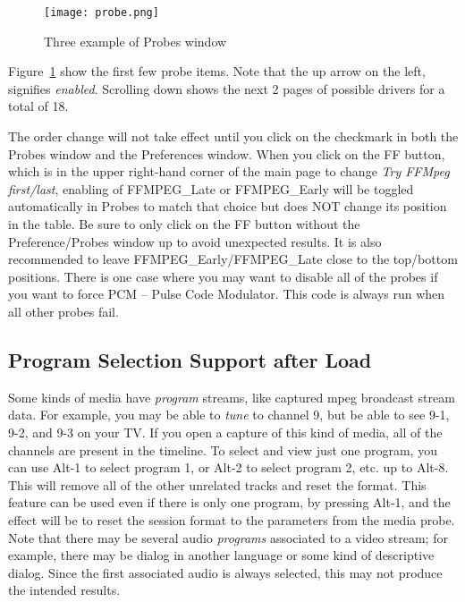 \begin{figure}[htpb]
    \centering
    \texttt{[image: probe.png]}
    \caption{Three example of Probes window}
    \label{fig:probe}
\end{figure}

Figure~\ref{fig:probe} show the first few probe items.  Note that the up arrow on the left, signifies \textit{enabled}.
Scrolling down shows the next 2 pages of possible drivers for a total of 18.

The order change will not take effect until you click on the checkmark in both the Probes window and the Preferences window.  When you click on the FF button, which is in the upper right-hand corner of the main page to change \textit{Try FFMpeg first/last}, enabling of FFMPEG\_Late or FFMPEG\_Early will be toggled automatically in Probes to match that choice but does NOT change its position in the table. Be sure to only click on the FF button without the Preference/Probes window up to avoid unexpected results.  It is also recommended to leave FFMPEG\_Early/FFMPEG\_Late close to the top/bottom positions.  There is one case where you may want to disable all of the probes if you want to force PCM -- Pulse Code Modulator.  This code is always run when all other probes fail.

\subsection{Program Selection Support after Load}%
\label{sub:program_selection_support_load}

Some kinds of media have \textit{program} streams, like captured mpeg broadcast stream data.  For example, you may be able to \textit{tune} to channel 9, but be able to see 9-1, 9-2, and 9-3 on your TV.  If you open a capture of this kind of media, all of the channels are present in the timeline.  To select and view just one program, you can use Alt-1 to select program 1, or Alt-2 to select program 2, etc. up to Alt-8.  This will remove all of the other unrelated tracks and reset the format.  This feature can be used even if there is only one program, by pressing Alt-1, and the effect will be to reset the session format to the parameters from the media probe.  Note that there may be several audio \textit{programs} associated to a video stream;
for example, there may be dialog in another language or some kind of descriptive dialog.  Since the first associated audio is always selected, this may not produce the intended results.

